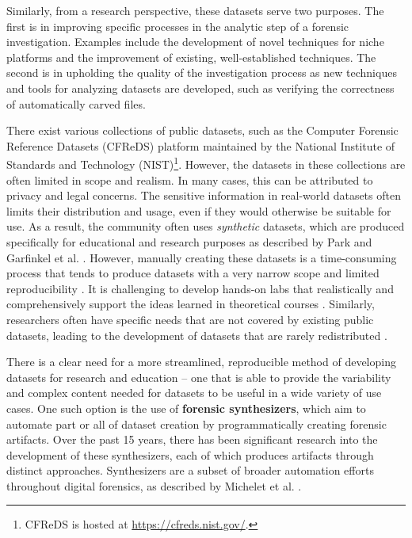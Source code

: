 \documentclass[preprint,12pt]{elsarticle}
\begin{document}
Similarly, from a research perspective, these datasets serve two
purposes. The first is in improving specific processes in the analytic
step of a forensic investigation. Examples include the development of
novel techniques for niche platforms and the improvement of existing,
well-established techniques. The second is in upholding the quality of
the investigation process as new techniques and tools for analyzing
datasets are developed, such as verifying the correctness of
automatically carved files.

There exist various collections of public datasets, such as the Computer
Forensic Reference Datasets (CFReDS) platform
\citep{nationalinstituteofstandardsandtechnologyCFReDSPortal}
maintained by the National Institute of Standards and Technology
(NIST)\footnote{CFReDS is hosted at \url{https://cfreds.nist.gov/}.}.
However, the datasets in these collections are often limited in scope
and realism. In many cases, this can be attributed to privacy and legal
concerns. The sensitive information in real-world datasets often limits
their distribution and usage, even if they would otherwise be suitable
for use. As a result, the community often uses \emph{synthetic}
datasets, which are produced specifically for educational and research
purposes as described by Park and Garfinkel et al.
\citep{parkTREDEVMPOPCultivating2018,garfinkelBringingScienceDigital2009}.
However, manually creating these datasets is a time-consuming process
that tends to produce datasets with a very narrow scope and limited
reproducibility
\citep{garfinkelBringingScienceDigital2009,grajedaAvailabilityDatasetsDigital2017}.
It is challenging to develop hands-on labs that realistically and
comprehensively support the ideas learned in theoretical courses
\citep{adelsteinAutomaticallyCreatingRealistic2005,guptaDigitalForensicsLab2022,lawrenceFrameworkDesignWebbased2009}.
Similarly, researchers often have specific needs that are not covered by
existing public datasets, leading to the development of datasets that
are rarely redistributed
\citep{grajedaAvailabilityDatasetsDigital2017}.

There is a clear need for a more streamlined, reproducible method of
developing datasets for research and education -- one that is able to
provide the variability and complex content needed for datasets to be
useful in a wide variety of use cases. One such option is the use of
\textbf{forensic synthesizers}, which aim to automate part or all of
dataset creation by programmatically creating forensic artifacts. Over
the past 15 years, there has been significant research into the
development of these synthesizers, each of which produces artifacts
through distinct approaches. Synthesizers are a subset of broader
automation efforts throughout digital forensics, as described by
Michelet et al. \citep{micheletAutomationDigitalForensics2023}.
\end{document}
